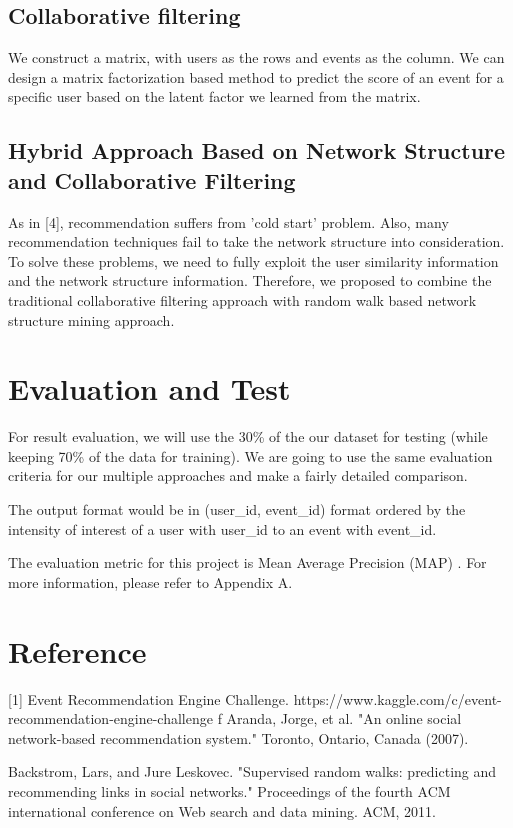 \documentclass{article}
\begin{document}
\subsection{Collaborative filtering}
We construct a matrix, with users as the rows and events as the column. We can design a matrix factorization based method to predict the score of an event for a specific user based on the latent factor we learned from the matrix.

\subsection{Hybrid Approach Based on Network Structure and Collaborative Filtering}
As in [4], recommendation suffers from 'cold start' problem. Also, many recommendation techniques fail to take the network structure into consideration. To solve these problems, we need to fully exploit the user similarity information and the network structure information. Therefore, we proposed to combine the traditional collaborative filtering approach with random walk based network structure mining approach. 



\section{Evaluation and Test}
For result evaluation, we will use the 30\% of the our dataset for testing (while keeping 70\% of the data for training). We are going to use the same evaluation criteria for our multiple approaches and make a fairly detailed comparison.

The output format would be in (user\_id, event\_id) format ordered by the intensity of interest of a user with user\_id to an event with event\_id.

The evaluation metric for this project is Mean Average Precision (MAP)	. For more information, please refer to Appendix A.


\section{Reference}
[1] Event Recommendation Engine Challenge.
https://www.kaggle.com/c/event-recommendation-engine-challenge
f
\noindent[2] Aranda, Jorge, et al. "An online social network-based recommendation system." Toronto, Ontario, Canada (2007).

\noindent[3] Backstrom, Lars, and Jure Leskovec. "Supervised random walks: predicting and recommending links in social networks." Proceedings of the fourth ACM international conference on Web search and data mining. ACM, 2011.
\end{document}
